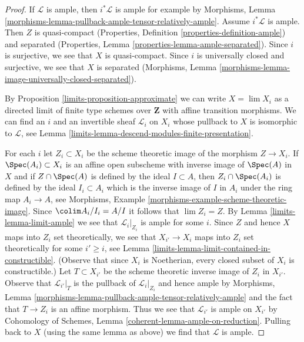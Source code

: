 \begin{proof}

If $\mathcal{L}$ is ample, then $i^*\mathcal{L}$ is ample for
example by Morphisms, Lemma
\ref{morphisms-lemma-pullback-ample-tensor-relatively-ample}.
Assume $i^*\mathcal{L}$ is ample. Then $Z$ is quasi-compact
(Properties, Definition \ref{properties-definition-ample})
and separated
(Properties, Lemma \ref{properties-lemma-ample-separated}).
Since $i$ is surjective, we see that $X$ is quasi-compact.
Since $i$ is universally closed and surjective, we see that
$X$ is separated (Morphisms, Lemma
\ref{morphisms-lemma-image-universally-closed-separated}).

\medskip\noindent
By Proposition \ref{limits-proposition-approximate} we can write
$X = \lim X_i$ as a directed limit of finite type schemes over $\mathbf{Z}$
with affine transition morphisms. We can find an $i$ and an invertible
sheaf $\mathcal{L}_i$ on $X_i$ whose pullback to $X$ is isomorphic to
$\mathcal{L}$, see Lemma \ref{limits-lemma-descend-modules-finite-presentation}.

\medskip\noindent
For each $i$ let $Z_i \subset X_i$ be the scheme theoretic image
of the morphism $Z \to X_i$. If $\Spec(A_i) \subset X_i$ is an affine
open subscheme with inverse image of $\Spec(A)$ in $X$ and if
$Z \cap \Spec(A)$ is defined by the ideal $I \subset A$, then
$Z_i \cap \Spec(A_i)$ is defined by the ideal $I_i \subset A_i$
which is the inverse image of $I$ in $A_i$ under the ring map
$A_i \to A$, see
Morphisms, Example \ref{morphisms-example-scheme-theoretic-image}.
Since $\colim A_i/I_i = A/I$ it follows that $\lim Z_i = Z$.
By Lemma \ref{limits-lemma-limit-ample} we see that $\mathcal{L}_i|_{Z_i}$
is ample for some $i$. Since $Z$ and hence $X$ maps into $Z_i$
set theoretically, we see that $X_{i'} \to X_i$ maps into $Z_i$
set theoretically for some $i' \geq i$, see
Lemma \ref{limits-lemma-limit-contained-in-constructible}.
(Observe that since $X_i$ is Noetherian, every closed subset
of $X_i$ is constructible.) Let $T \subset X_{i'}$
be the scheme theoretic inverse image of $Z_i$ in $X_{i'}$.
Observe that $\mathcal{L}_{i'}|_T$ is the pullback
of $\mathcal{L}_i|_{Z_i}$ and hence ample by
Morphisms, Lemma \ref{morphisms-lemma-pullback-ample-tensor-relatively-ample}
and the fact that $T \to Z_i$ is an affine morphism.
Thus we see that $\mathcal{L}_{i'}$ is ample on $X_{i'}$
by Cohomology of Schemes, Lemma \ref{coherent-lemma-ample-on-reduction}.
Pulling back to $X$ (using the same lemma as above)
we find that $\mathcal{L}$ is ample.
\end{proof}

